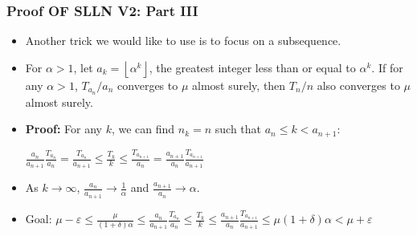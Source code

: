 \documentclass[handout]{beamer}
\newcommand{\BP}{\mathbf{P}}
\begin{document}
\frame
{
  \frametitle{Proof OF SLLN V2: Part III}

   \begin{itemize}
   \item<1-> Another trick we would like to use is to focus on a subsequence. 
       
    \item<2->[]\begin{Lemma} For $\alpha>1$, let $a_k=\left \lfloor{\alpha^k}\right \rfloor$, the greatest integer less than or equal to $\alpha^k$. If for any $\alpha>1$, $T_{a_n}/a_n$ converges to $\mu$ almost surely, then $T_n/n$ also converges to $\mu$ almost surely. \end{Lemma}
        
    \item<3-> \textbf{Proof:} For any $k$, we can find $n_k = n$ such that $a_n\leq k < a_{n+1}$:
    
    $\frac{a_n}{a_{n+1}}\frac{T_{a_n}}{a_{n}}= \frac{T_{a_n}}{a_{n+1}} \leq \frac{T_{k}}{k}\leq \frac{T_{a_{n+1}}}{a_{n}} = \frac{a_{n+1}}{a_{n}}\frac{T_{a_{n+1}}}{a_{n+1}}$
    
   
  \item<4-> [-] As $k\rightarrow \infty$, $\frac{a_n}{a_{n+1}}\rightarrow \frac{1}{\alpha}$ and $\frac{a_{n+1}}{a_{n}}\rightarrow \alpha$. 

  \item<5->[-] Goal:       $\mu - \varepsilon \le \frac{\mu}{(1+\delta)\alpha} \le \frac{a_n}{a_{n+1}}\frac{T_{a_n}}{a_{n}} \leq \frac{T_{k}}{k} \leq  \frac{a_{n+1}}{a_{n}}\frac{T_{a_{n+1}}}{a_{n+1}} \le \mu(1+\delta)\alpha < \mu + \varepsilon$
  


%  
                                            
\end{itemize}
}
\end{document}
